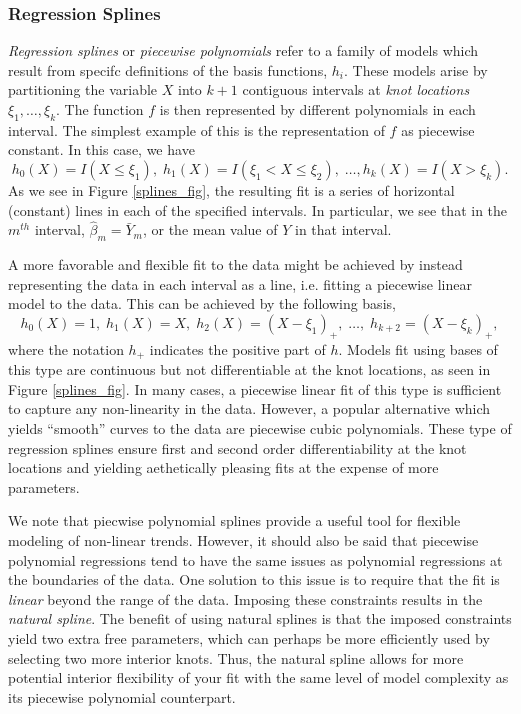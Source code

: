 \subsubsection{Regression Splines}

\emph{Regression splines} or \emph{piecewise polynomials} refer to a family of models which result from specifc definitions of the basis functions, $h_i$. These models arise by partitioning the variable $X$ into $k+1$  contiguous intervals at \emph{knot locations} $\xi_1, \dots, \xi_{k}$. The function $f$ is then represented by different polynomials in each interval. The simplest example of this is the representation of $f$ as piecewise constant. In this case, we have
	\[h_0(X) = I(X \leq \xi_1),\; h_1(X)=I(\xi_1 < X \leq \xi_2), \; \dots, h_{k}(X) = I(X > \xi_k).  \]
As we see in Figure \ref{splines_fig}, the resulting fit is a series of horizontal (constant) lines in each of the specified intervals. In particular, we see that in the $m^{th}$ interval, $\hat{\beta}_m = \bar{Y}_m$, or the mean value of $Y$ in that interval.

A more favorable and flexible fit to the data might be achieved by instead representing the data in each interval as a line, i.e. fitting a piecewise linear model to the data. This can be achieved by the following basis,
	\[h_0(X) = 1,\; h_1(X) = X,\; h_2(X) = (X- \xi_1)_+,\; \dots,\; h_{k+2}=(X-\xi_k)_+,\]
where the notation $h_+$ indicates the positive part of $h$. Models fit using bases of this type are continuous but not differentiable at the knot locations, as seen in  Figure \ref{splines_fig}. In many cases, a piecewise linear fit of this type is sufficient to capture any non-linearity in the data. However, a popular alternative which yields ``smooth'' curves to the data are piecewise cubic polynomials. These type of regression splines ensure first and second order differentiability at the knot locations and yielding aethetically pleasing fits at the expense of more parameters.

We note that piecwise polynomial splines provide a useful tool for flexible modeling of non-linear trends. However, it should also be said that piecewise polynomial regressions tend to have the same issues as polynomial regressions at the boundaries of the data. One solution to this issue is to require that the fit is \emph{linear} beyond the range of the data. Imposing these constraints results in the \emph{natural spline}. The benefit of using natural splines is that the imposed constraints yield two extra free parameters, which can perhaps be more efficiently used by selecting two more interior knots. Thus, the natural spline allows for more potential interior flexibility of your fit with the same level of model complexity as its piecewise polynomial counterpart.

